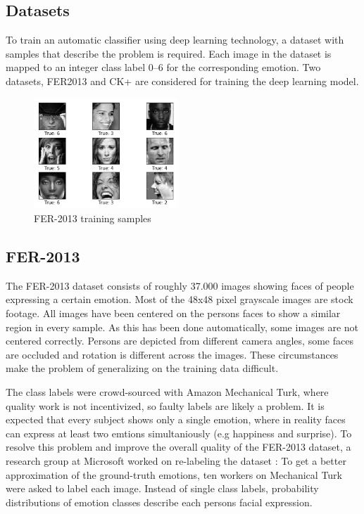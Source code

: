 \documentclass[twoside]{article}
\begin{document}
\begin{multicols}{2}
\section{Datasets}
To train an automatic classifier using deep learning technology, a dataset with samples that describe the problem is required. Each image in the dataset is mapped to an integer class label 0–6 for the corresponding emotion. Two datasets, FER2013 \cite{goodfel13} and CK+ \cite{cohn00} are considered for training the deep learning model.

\begin{figure}[H]
	\includegraphics[width=0.48\textwidth]{fer_examples}
	\caption{FER-2013 training samples}
\end{figure}


\subsection{FER-2013}
The FER-2013 dataset consists of roughly 37.000 images showing faces of people expressing a certain emotion. Most of the 48x48 pixel grayscale images are stock footage. All images have been centered on the persons faces to show a similar region in every sample. As this has been done automatically, some images are not centered correctly. Persons are depicted from different camera angles, some faces are occluded and rotation is different across the images. These circumstances make the problem of generalizing on the training data difficult. 

The class labels were crowd-sourced with Amazon Mechanical Turk, where quality work is not incentivized, so faulty labels are likely a problem. It is expected that every subject shows only a single emotion, where in reality faces can express at least two emtions simultaniously (e.g happiness and surprise). To resolve this problem and improve the overall quality of the FER-2013 dataset, a research group at Microsoft worked on re-labeling the dataset \cite{barsoum16}: To get a better approximation of the ground-truth emotions, ten workers on Mechanical Turk were asked to label each image. Instead of single class labels, probability distributions of emotion classes describe each persons facial expression.


\end{multicols}
\end{document}
